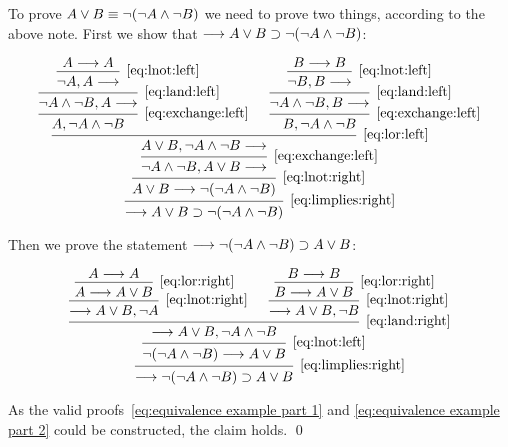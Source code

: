 \documentclass[11pt,a4paper]{article}
\begin{document}
\begin{example}[Exercise 2.5.1]\label{exa:2.5.1}
    To prove \(A\lor B\equiv \lnot(\lnot A\land\lnot B)\) we need to prove two things,
    according to the above note. First we show that
    \(\longrightarrow A\lor B\supset\lnot(\lnot A\land\lnot B)\):

\begin{equation}\label{eq:equivalence example part 1}
    \begin{prooftree}
        \hypo{A\seq A}
        \infer1[\eqref{eq:lnot:left}]{\lnot A, A\seq}
        \infer1[\eqref{eq:land:left}]{\lnot A\land\lnot B, A\seq}
        \infer1[\eqref{eq:exchange:left}]{A, \lnot A\land\lnot B}
        \hypo{B\seq B}
        \infer1[\eqref{eq:lnot:left}]{\lnot B, B\seq}
        \infer1[\eqref{eq:land:left}]{\lnot A\land\lnot B, B\seq}
        \infer1[\eqref{eq:exchange:left}]{B, \lnot A\land\lnot B}
        \infer2[\eqref{eq:lor:left}]{A\lor B, \lnot A \land\lnot B\seq}
        \infer1[\eqref{eq:exchange:left}]{\lnot A \land\lnot B, A\lor B\seq}
        \infer1[\eqref{eq:lnot:right}]{A\lor B \seq\lnot\arcs{\lnot A \land\lnot B}}
        \infer1[\eqref{eq:limplies:right}]{\seq A\lor B\limplies\lnot\arcs{\lnot A\land\lnot B}}
    \end{prooftree}
\end{equation}

Then we prove the statement \(\longrightarrow\lnot(\lnot A \land\lnot B) \supset A\lor B\):

\begin{equation}\label{eq:equivalence example part 2}
    \begin{prooftree}
        \hypo{A\seq A}
        \infer1[\eqref{eq:lor:right}]{A\seq A\lor B}
        \infer1[\eqref{eq:lnot:right}]{\seq A\lor B, \lnot A}
        \hypo{B\seq B}
        \infer1[\eqref{eq:lor:right}]{B\seq A\lor B}
        \infer1[\eqref{eq:lnot:right}]{\seq A\lor B, \lnot B}
        \infer2[\eqref{eq:land:right}]{\seq A\lor B, \lnot A\land\lnot B}
        \infer1[\eqref{eq:lnot:left}]{\lnot\arcs{\lnot A \land\lnot B}\seq A\lor B}
        \infer1[\eqref{eq:limplies:right}]{\seq\lnot\arcs{\lnot A \land\lnot B}\limplies A\lor B}
    \end{prooftree}
\end{equation}

As the valid proofs~\ref{eq:equivalence example part 1} and \ref{eq:equivalence example part 2}
could be constructed, the claim holds. \qed
\end{example}
\end{document}
